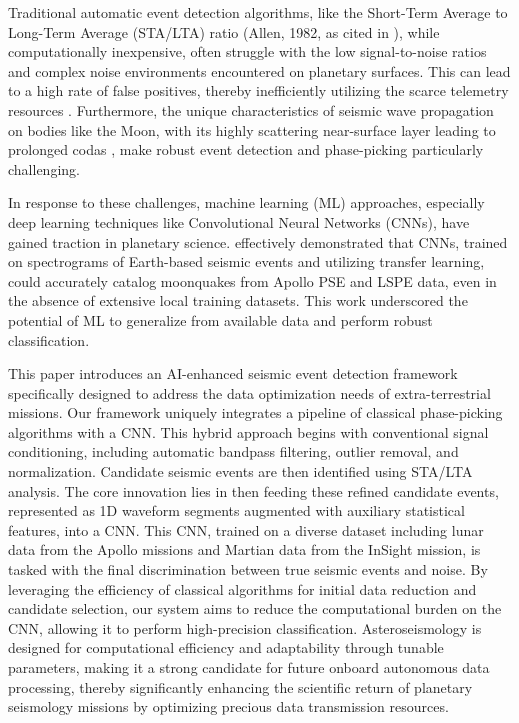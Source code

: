 \documentclass[conference]{IEEEtran}
\begin{document}
    Traditional automatic event detection algorithms, like the Short-Term Average to Long-Term Average (STA/LTA) ratio
    (Allen, 1982, as cited in \cite{Civilini2021}), while computationally inexpensive, often struggle with the low
    signal-to-noise ratios and complex noise environments encountered on planetary surfaces. This can lead to a high
    rate of false positives, thereby inefficiently utilizing the scarce telemetry resources \cite{Civilini2021}.
    Furthermore, the unique characteristics of seismic wave propagation on bodies like the Moon, with its highly
    scattering near-surface layer leading to prolonged codas \cite{Dainty1981, Nakamura1982}, make robust event
    detection and phase-picking particularly challenging.

    In response to these challenges, machine learning (ML) approaches, especially deep learning techniques like
    Convolutional Neural Networks (CNNs), have gained traction in planetary science. \cite{Civilini2021} effectively
    demonstrated that CNNs, trained on spectrograms of Earth-based seismic events and utilizing transfer learning, could
    accurately catalog moonquakes from Apollo PSE and LSPE data, even in the absence of extensive local training
    datasets. This work underscored the potential of ML to generalize from available data and perform robust
    classification.

    This paper introduces an AI-enhanced seismic event detection framework specifically designed to
    address the data optimization needs of extra-terrestrial missions. Our framework uniquely integrates a pipeline of
    classical phase-picking algorithms with a CNN. This hybrid approach begins with conventional signal
    conditioning, including automatic bandpass filtering, outlier removal, and normalization. Candidate seismic events
    are then identified using STA/LTA analysis. The core innovation lies in then feeding these refined candidate events,
    represented as 1D waveform segments augmented with auxiliary statistical features, into a CNN. This CNN, trained on
    a diverse dataset including lunar data from the Apollo missions and Martian data from the InSight mission, is tasked
    with the final discrimination between true seismic events and noise. By leveraging the efficiency of classical
    algorithms for initial data reduction and candidate selection, our system aims to reduce the computational burden on
    the CNN, allowing it to perform high-precision classification. Asteroseismology is designed for computational
    efficiency and adaptability through tunable parameters, making it a strong candidate for future onboard autonomous
    data processing, thereby significantly enhancing the scientific return of planetary seismology missions by
    optimizing precious data transmission resources.
\end{document}
